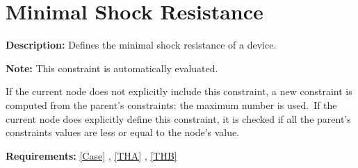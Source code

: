 \section{Minimal Shock Resistance}\label{CONSTRAINTMinShockResistance}
\textbf{Description:} Defines the minimal shock resistance of a device.

\textbf{Note:} This constraint is automatically evaluated.\par
If the current node does not explicitly include this constraint, a
new constraint is computed from the parent's constraints: the maximum
number is used.\
If the current node does explicitly define this constraint, it is
checked if all the parent's constraints values are less or equal to
the node's value.

\textbf{Requirements:} \ref{Case} , \ref{THA} , \ref{THB} 
